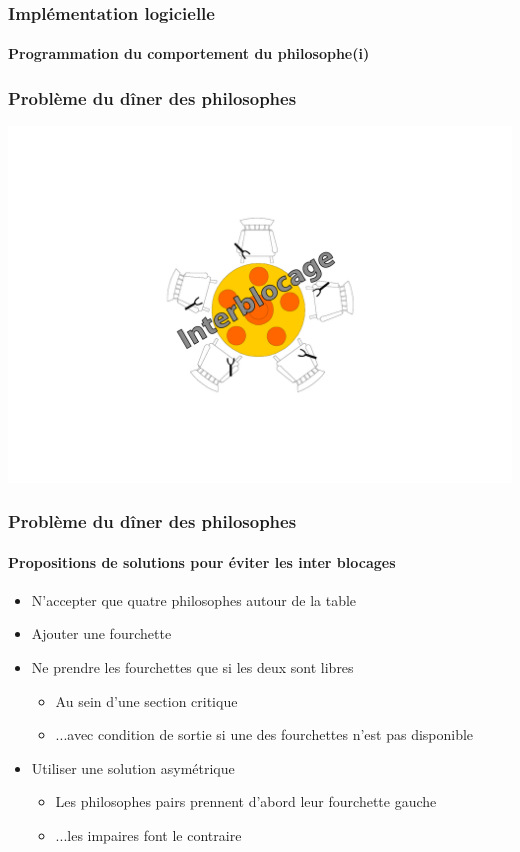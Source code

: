 \begin{frame}
\frametitle{Implémentation logicielle}
\framesubtitle{Programmation du comportement du philosophe(i)}
\begin{scriptsize}

\end{scriptsize}
\end{frame}

\begin{frame}
\frametitle{Problème du dîner des philosophes}
\begin{center}
\includegraphics[height=.9\textheight]{../illustration/diner_philosophes_ib.pdf}
\end{center}
\end{frame}

\begin{frame}
\frametitle{Problème du dîner des philosophes}
\framesubtitle{Propositions de solutions pour éviter les inter blocages}
\begin{itemize}
\item <1-> N’accepter que quatre philosophes autour de la table
\item <2-> Ajouter une fourchette
\item <3-> Ne prendre les fourchettes que si les deux sont libres
\begin{itemize}
\item Au sein d’une section critique
\item ...avec condition de sortie si une des fourchettes n'est pas disponible
\end{itemize}
\item <4-> Utiliser une solution asymétrique
\begin{itemize}
\item Les philosophes pairs prennent d’abord leur fourchette gauche
\item ...les impaires font le contraire
\end{itemize}
\end{itemize}
\end{frame}

